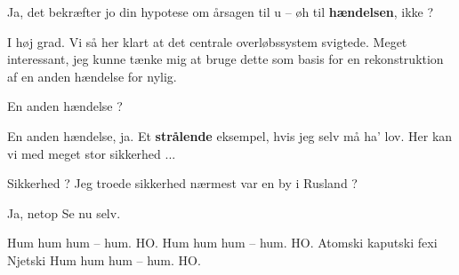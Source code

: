 \documentclass[a4paper,11pt]{article}
\begin{document}
\begin{sketch}
 Ja, det bekræfter jo din hypotese om årsagen til u -- øh til
\textbf{hændelsen}, ikke ?

 I høj grad.  Vi så her klart at det centrale overløbssystem svigtede.
Meget interessant, jeg kunne tænke mig at bruge dette som basis for en
rekonstruktion af en anden hændelse for nylig.

 En anden hændelse ?

 En anden hændelse, ja.  Et \textbf{strålende} eksempel, hvis jeg selv
må ha' lov.  Her kan vi med meget stor sikkerhed ...

  Sikkerhed ?  Jeg troede sikkerhed nærmest var en by i
Rusland ?

 Ja, netop  Se nu selv.


\end{sketch}

\begin{song}
Hum hum hum -- hum. HO.
Hum hum hum -- hum. HO.
Atomski kaputski fexi Njetski
Hum hum hum -- hum. HO.
\end{song}
\end{document}
